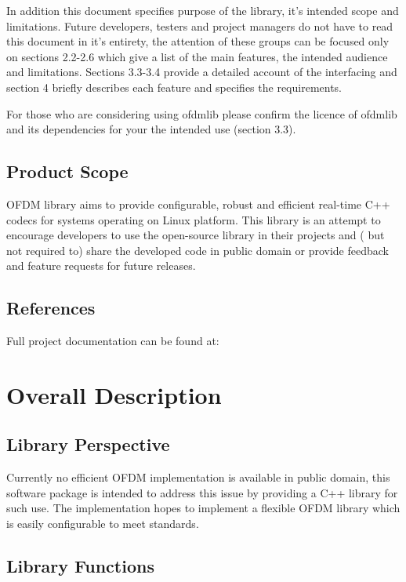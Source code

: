 \documentclass[]{report}
\begin{document}
In addition this document specifies purpose of the library, it's intended scope and limitations. Future developers, testers and project managers do not have to read this document in it's entirety, the attention of these groups can be focused only on sections 2.2-2.6 which give a list of the main features, the intended audience and limitations. Sections 3.3-3.4 provide a detailed account of the interfacing and section 4 briefly describes each feature and specifies the requirements.

For those who are considering using ofdmlib please confirm the licence of ofdmlib and its dependencies for your the intended use (section 3.3).


\subsection{Product Scope}

OFDM library aims to provide configurable, robust and efficient real-time C++ codecs for systems operating on Linux platform. This library is an attempt to encourage developers to use the open-source library in their projects and ( but not required to) share the developed code in public domain or provide feedback and feature requests for future releases.

\subsection{References}

Full project documentation can be found at: 

\pagebreak
\section{Overall Description}

\subsection{Library Perspective}

Currently no efficient OFDM implementation is available in public domain, this software package is intended to address this issue by providing a C++ library for such use. The implementation hopes to implement a flexible OFDM library which is easily configurable to meet standards. 


\subsection{Library Functions}
\end{document}
